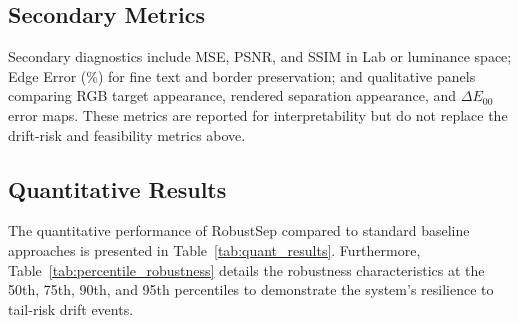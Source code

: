 \documentclass[acmsmall,screen,nonacm]{acmart}
\begin{document}
\subsection{Secondary Metrics}

Secondary diagnostics include MSE, PSNR, and SSIM in Lab or luminance space; Edge Error (\%) for fine text and border preservation; and qualitative panels comparing RGB target appearance, rendered separation appearance, and $\Delta E_{00}$ error maps. These metrics are reported for interpretability but do not replace the drift-risk and feasibility metrics above.

\subsection{Quantitative Results}

The quantitative performance of RobustSep compared to standard baseline approaches is presented in Table~\ref{tab:quant_results}. Furthermore, Table~\ref{tab:percentile_robustness} details the robustness characteristics at the 50th, 75th, 90th, and 95th percentiles to demonstrate the system's resilience to tail-risk drift events.
\end{document}
